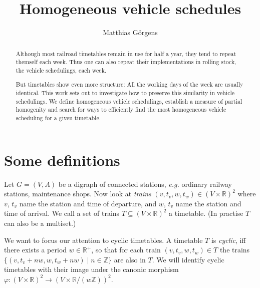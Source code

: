 \documentclass{amsart} %
\author{Matthias Görgens}
\def\eg{\emph{e.g.}}
\begin{document}
\title{Homogeneous vehicle schedules}

\begin{abstract}


  Although most railroad timetables remain in use for half a
  year, they tend to repeat themself each week.  Thus one can also
  repeat their implementations in rolling stock, the vehicle
  schedulings, each week.

  But timetables show even more structure: All the working days of the
  week are usually identical.  This work sets out to investigate how
  to preserve this similarity in vehicle schedulings.  We define
  homogeneous vehicle schedulings, establish a measure of partial
  homogenity and search for ways to efficiently find the most
  homogeneous vehicle scheduling for a given timetable.
\end{abstract}



\maketitle
\section{Some definitions}

Let \(G=(V,A)\) be a digraph of connected stations, \eg{} ordinary
railway stations, maintenance shops.  Now look at \label{trains}
\textit{trains} \((v, t_v, w, t_w) \in \left(V \times \mathbb{R}\right)^2 \)
where \(v\), \(t_v\) name the station and time of departure, and
\(w\), \(t_v\) name the station and time of arrival.  We call a set of
trains \(T \subseteq \left(V \times \mathbb{R}\right)^2\) a timetable.  (In
practise \(T\) can also be a multiset.)

We want to focus our attention to cyclic timetables.  A timetable \(T\)
is \label{cyclic} \textit{cyclic}, iff there exists a period \(w \in
\mathbb{R}^+\), so that for each train \((v, t_v, w, t_w) \in T\)
the trains \(\{(v, t_v+n w, w, t_w +n w) \mid n \in \mathbb{Z}\}\)
are also in \(T\).  We will identify cyclic timetables with their
image under the canonic morphism
\(\varphi \colon \left(V \times \mathbb{R}\right)^2
\to \left(V \times \mathbb{R}/{\left(w \mathbb{Z}\right)}\right)^2\).
\end{document}
